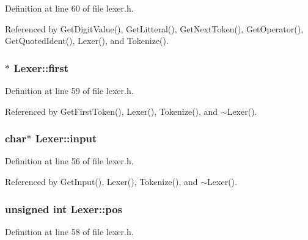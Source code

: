 Definition at line 60 of file lexer.\+h.



Referenced by Get\+Digit\+Value(), Get\+Litteral(), Get\+Next\+Token(), Get\+Operator(), Get\+Quoted\+Ident(), Lexer(), and Tokenize().

\subsubsection[{\texorpdfstring{first}{first}}]{$\ast$ Lexer\+::first\hspace{0.3cm}{\ttfamily [private]}}\hypertarget{classLexer_a46cf6921cad18dcebca5eeae831dd9b9}{}\label{classLexer_a46cf6921cad18dcebca5eeae831dd9b9}


Definition at line 59 of file lexer.\+h.



Referenced by Get\+First\+Token(), Lexer(), Tokenize(), and $\sim$\+Lexer().

\subsubsection[{\texorpdfstring{input}{input}}]{\setlength{\rightskip}{0pt plus 5cm}char$\ast$ Lexer\+::input\hspace{0.3cm}{\ttfamily [private]}}\hypertarget{classLexer_a9ef909535b14de749d95e5a48217f1c9}{}\label{classLexer_a9ef909535b14de749d95e5a48217f1c9}


Definition at line 56 of file lexer.\+h.



Referenced by Get\+Input(), Lexer(), Tokenize(), and $\sim$\+Lexer().

\subsubsection[{\texorpdfstring{pos}{pos}}]{\setlength{\rightskip}{0pt plus 5cm}unsigned int Lexer\+::pos\hspace{0.3cm}{\ttfamily [private]}}\hypertarget{classLexer_a91a95d9b5edaf25f634fabecaf7f40b5}{}\label{classLexer_a91a95d9b5edaf25f634fabecaf7f40b5}


Definition at line 58 of file lexer.\+h.



